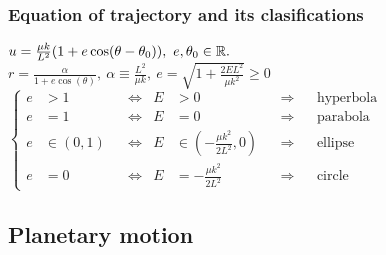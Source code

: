 \subsubsection*{Equation of trajectory and its clasifications}
$u=\frac{\mu k}{L^{2}}(1+e\cos(\theta-\theta_{0})),\ e,\theta_{0}\in\mathbb{R}.$\\
$r=\frac{\alpha}{1+e\cos(\theta)},\ \alpha\equiv\frac{L^{2}}{\mu k},\ e=\sqrt{1+\frac{2EL^{2}}{\mu k^{2}}}\geq0$\\
$
\left\{
\begin{aligned}
e&>1     &    &\iff     &   E&>0  &  &\Rightarrow   &   &\text{hyperbola}\\
e&=1     &   &\iff  &   E&=0  &  &\Rightarrow   &   &\text{parabola}\\
e&\in(0,1)   &   &\iff  &   E&\in(-\frac{\mu k^{2}}{2L^{2}},0)  &  &\Rightarrow   &   &\text{ellipse}\\
e&=0     &    &\iff     &   E&=-\frac{\mu k^{2}}{2L^{2}}    &   &\Rightarrow   &   &\text{circle}
\end{aligned}
\right.$


\subsection{Planetary motion}
